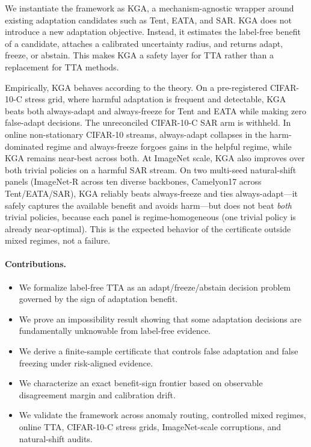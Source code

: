 \documentclass[11pt]{article}
\theoremstyle{plain}
\theoremstyle{definition}
\begin{document}
We instantiate the framework as \textsc{KGA}, a mechanism-agnostic wrapper around
existing adaptation candidates such as Tent, EATA, and SAR. \textsc{KGA} does not
introduce a new adaptation objective. Instead, it estimates the label-free benefit
of a candidate, attaches a calibrated uncertainty radius, and returns adapt,
freeze, or abstain. This makes \textsc{KGA} a safety layer for TTA rather than a
replacement for TTA methods.

Empirically, \textsc{KGA} behaves according to the theory. On a pre-registered
CIFAR-10-C stress grid, where harmful adaptation is frequent and detectable,
\textsc{KGA} beats both always-adapt and always-freeze for Tent and EATA while
making zero false-adapt decisions. The unreconciled CIFAR-10-C SAR arm is withheld. In
online non-stationary CIFAR-10 streams, always-adapt collapses in the harm-dominated
regime and always-freeze forgoes gains in the helpful regime, while \textsc{KGA}
remains near-best across both. At ImageNet scale, \textsc{KGA} also improves over
both trivial policies on a harmful SAR stream. On two multi-seed natural-shift
panels (ImageNet-R across ten diverse backbones, Camelyon17 across Tent/EATA/SAR),
\textsc{KGA} reliably beats always-freeze and ties always-adapt---it safely
captures the available benefit and avoids harm---but does not beat \emph{both}
trivial policies, because each panel is regime-homogeneous (one trivial policy is
already near-optimal). This is the expected behavior of the certificate outside
mixed regimes, not a failure.

\paragraph{Contributions.}
\begin{itemize}
\item We formalize label-free TTA as an adapt/freeze/abstain decision problem governed by the sign of adaptation benefit.
\item We prove an impossibility result showing that some adaptation decisions are fundamentally unknowable from label-free evidence.
\item We derive a finite-sample certificate that controls false adaptation and false freezing under risk-aligned evidence.
\item We characterize an exact benefit-sign frontier based on observable disagreement margin and calibration drift.
\item We validate the framework across anomaly routing, controlled mixed regimes, online TTA, CIFAR-10-C stress grids, ImageNet-scale corruptions, and natural-shift audits.
\end{itemize}
\end{document}

